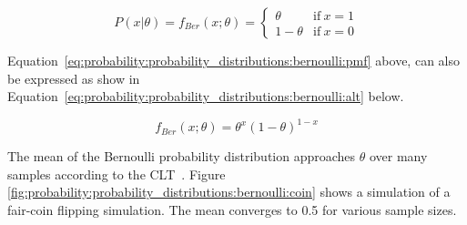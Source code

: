 \begin{equation}
      \label{eq:probability:probability_distributions:bernoulli:pmf}
      P(x \vert \theta) = f_{Ber}(x; \theta) =
      \begin{cases}
            \theta     & \text{if}\ x=1 \\
            1 - \theta & \text{if}\ x=0
      \end{cases}
\end{equation}

\noindent
Equation~\eqref{eq:probability:probability_distributions:bernoulli:pmf} above, can also be expressed as show in Equation~\eqref{eq:probability:probability_distributions:bernoulli:alt} below.

\begin{equation}
      \label{eq:probability:probability_distributions:bernoulli:alt}
      f_{Ber}(x; \theta) = \theta^{x}(1-\theta)^{1-x}
\end{equation}

\noindent
The mean of the Bernoulli probability distribution approaches $\theta$ over many samples according to the \acs{CLT}~\cite{ref:grinstead:1997}. Figure \ref{fig:probability:probability_distributions:bernoulli:coin} shows a simulation of a fair-coin flipping simulation. The mean converges to 0.5 for various sample sizes.


